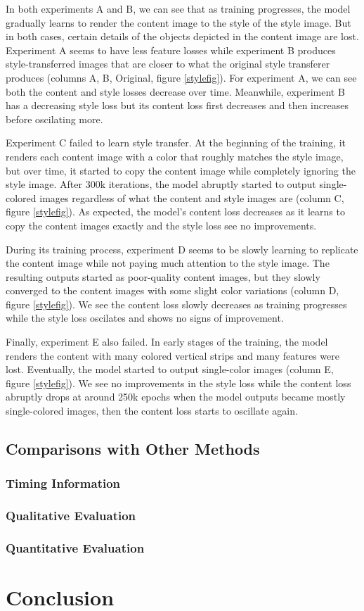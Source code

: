 \documentclass{article}
\begin{document}
In both experiments A and B, we can see that as training progresses, the model gradually learns to render the content image to the style of the style image. But in both cases, certain details of the objects depicted in the content image are lost. Experiment A seems to have less feature losses while experiment B produces style-transferred images that are closer to what the original style transferer produces (columns A, B, Original, figure \ref{stylefig}). For experiment A, we can see both the content and style losses decrease over time. Meanwhile, experiment B has a decreasing style loss but its content loss first decreases and then increases before oscilating more.

Experiment C failed to learn style transfer. At the beginning of the training, it renders each content image with a color that roughly matches the style image, but over time, it started to copy the content image while completely ignoring the style image. After 300k iterations, the model abruptly started to output single-colored images regardless of what the content and style images are (column C, figure \ref{stylefig}). As expected, the model's content loss decreases as it learns to copy the content images exactly and the style loss see no improvements.

During its training process, experiment D seems to be slowly learning to replicate the content image while not paying much attention to the style image. The resulting outputs started as poor-quality content images, but they slowly converged to the content images with some slight color variations (column D, figure \ref{stylefig}). We see the content loss slowly decreases as training progresses while the style loss oscilates and shows no signs of improvement.

Finally, experiment E also failed. In early stages of the training, the model renders the content with many colored vertical strips and many features were lost. Eventually, the model started to output single-color images (column E, figure \ref{stylefig}). We see no improvements in the style loss while the content loss abruptly drops at around 250k epochs when the model outputs became mostly single-colored images, then the content loss starts to oscillate again.

\subsection{Comparisons with Other Methods}

\subsubsection{Timing Information}

\subsubsection{Qualitative Evaluation}

\subsubsection{Quantitative Evaluation}

\section{Conclusion}

\medskip

\nocite{*}


\end{document}
